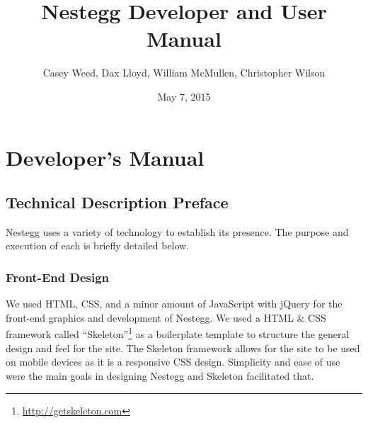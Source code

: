\documentclass[11pt]{article}
\title{Nestegg Developer and User Manual}
\author{Casey Weed, Dax Lloyd, William McMullen, Christopher Wilson}
\date{May 7, 2015}
\begin{document}
	\maketitle
	\thispagestyle{empty} %
	
	\newpage
	\setcounter{tocdepth}{4}
	\tableofcontents
	\thispagestyle{empty}
	\clearpage
	
	\setcounter{page}{1}
	
	\section{Developer's Manual}
		
		\subsection{Technical Description Preface}
			Nestegg uses a variety of technology to establish its presence. The purpose and execution of each is briefly detailed below.		
				
			\subsubsection{Front-End Design}
				We used HTML, CSS, and a minor amount of JavaScript with jQuery for the front-end graphics and development of Nestegg. We used a HTML \& CSS framework called ``Skeleton''\footnote{\url{http://getskeleton.com}} as a boilerplate template to structure the general design and feel for the site. The Skeleton framework allows for the site to be used on mobile devices as it is a responsive CSS design. Simplicity and ease of use were the main goals in designing Nestegg and Skeleton facilitated that.
				
\end{document}
